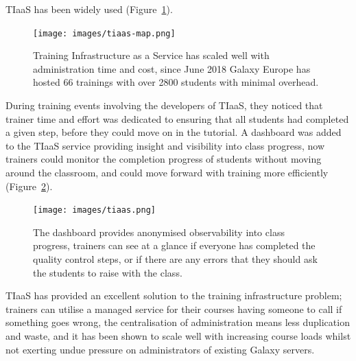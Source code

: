 \documentclass[10pt,letterpaper]{article}
\begin{document}
TIaaS has been widely used (Figure~\ref{fig:tiaas-map}).

\begin{figure}[!ht]
	\centering
	\texttt{[image: images/tiaas-map.png]}
	\caption{Training Infrastructure as a Service has scaled well with administration time and cost, since June 2018 Galaxy Europe has hosted 66 trainings with over 2800 students with minimal overhead.\label{fig:tiaas-map}}
\end{figure}


During training events involving the developers of TIaaS, they noticed that trainer time and effort was dedicated to ensuring that all students had completed a given step, before they could move on in the tutorial.
A dashboard was added to the TIaaS service providing insight and visibility into class progress, now trainers could monitor the completion progress of students without moving around the classroom, and could move forward with training more efficiently (Figure~\ref{fig:tiaas}).


\begin{figure}[!ht]
	\centering
	\texttt{[image: images/tiaas.png]}
	\caption{The dashboard provides anonymised observability into class progress, trainers can see at a glance if everyone has completed the quality control steps, or if there are any errors that they should ask the students to raise with the class.\label{fig:tiaas}}
\end{figure}

TIaaS has provided an excellent solution to the training infrastructure problem; trainers can utilise a managed service for their courses having someone to call if something goes wrong, the centralisation of administration means less duplication and waste, and it has been shown to scale well with increasing course loads whilst not exerting undue pressure on administrators of existing Galaxy servers.
\end{document}
